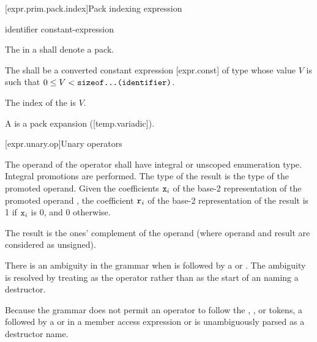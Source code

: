 \documentclass{wg21}
\begin{document}
\begin{addedblock}

[expr.prim.pack.index]{Pack indexing expression}

\begin{bnf}
    \br
    identifier  \terminal{[} constant-expression \terminal{]}  \br
\end{bnf}

The  in a  shall denote a pack.

The  shall be a converted constant expression [expr.const] of type  whose value $V$ is such that $0 \le V < \texttt{sizeof...(identifier)}$.

The index of the  is $V$.

A  is a pack expansion ([temp.variadic]).


\end{addedblock}

[expr.unary.op]{Unary operators}


\pnum
{}%
The operand of the \tcode{\~{}} operator shall have integral or unscoped enumeration type.
Integral promotions are performed.
The type of the result is the type of the promoted operand.
Given the coefficients $\texttt{x}_i$
of the base-2 representation
of the promoted operand ,
the coefficient $\texttt{r}_i$
of the base-2 representation of the result 
is 1 if $\texttt{x}_i$ is 0, and 0 otherwise.
\begin{note}
	The result is the ones' complement of the operand
	(where operand and result are considered as unsigned).
\end{note}
There is an ambiguity
in the grammar when \tcode{\~{}} is followed by
a  or .
The ambiguity is resolved by treating \tcode{\~{}} as the
operator rather than as the start of an 
naming a destructor.
\begin{note}
	Because the grammar does not permit an operator to follow the
	, \tcode{->}, or \tcode{::} tokens, a \tcode{\~{}} followed by
	a  or  in a
	member access expression or  is
	unambiguously parsed as a destructor name.
\end{note}
\end{document}
